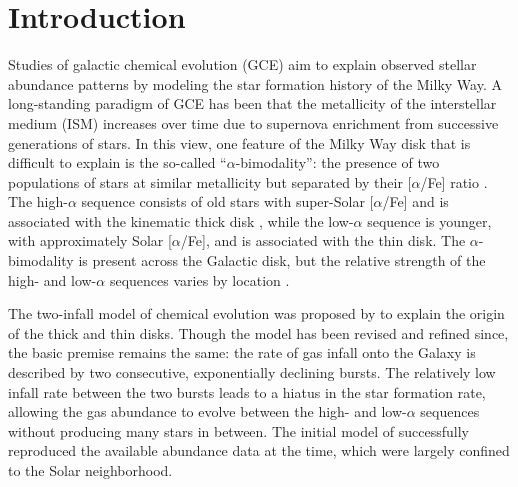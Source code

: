 \documentclass[twocolumn,twocolappendix,linenumbers]{aastex631}
\newcommand{\aFe}{[$\alpha$/Fe]\xspace}
\newcommand{\todo}[1]{{\color{red}#1}}
\begin{document}
% 

\section{Introduction}

Studies of galactic chemical evolution (GCE) aim to explain observed stellar abundance patterns by modeling the star formation history of the Milky Way. A long-standing paradigm of GCE has been that the metallicity of the interstellar medium (ISM) increases over time due to supernova enrichment from successive generations of stars. In this view, one feature of the Milky Way disk that is difficult to explain is the so-called ``$\alpha$-bimodality'': the presence of two populations of stars at similar metallicity but separated by their \aFe ratio \citep[e.g.,][]{bensby_exploring_2014}. The high-$\alpha$ sequence consists of old stars \citep[$\sim9$ Gyr;][]{pinsonneault_apokasc-3_2025} with super-Solar \aFe and is associated with the kinematic thick disk \citep[e.g.,][]{fuhrmann_nearby_1998}, while the low-$\alpha$ sequence is younger, with approximately Solar \aFe, and is associated with the thin disk. The $\alpha$-bimodality is present across the Galactic disk, but the relative strength of the high- and low-$\alpha$ sequences varies by location \citep{hayden_chemical_2015}.

The two-infall model of chemical evolution was proposed by \citet{chiappini_chemical_1997} to explain the origin of the thick and thin disks. Though the model has been revised and refined since, the basic premise remains the same: the rate of gas infall onto the Galaxy is described by two consecutive, exponentially declining bursts. The relatively low infall rate between the two bursts leads to a hiatus in the star formation rate, allowing the gas abundance to evolve between the high- and low-$\alpha$ sequences without producing many stars in between. 
The initial model of \citet{chiappini_chemical_1997} successfully reproduced the available abundance data at the time, which were largely confined to the Solar neighborhood.
\end{document}
